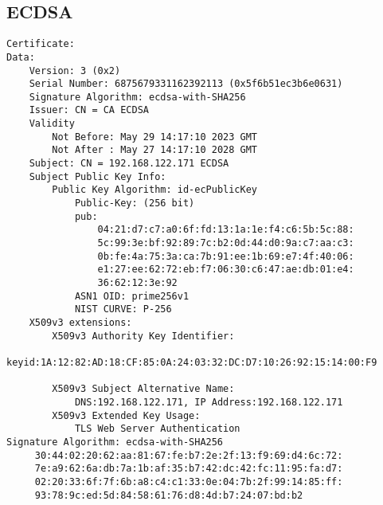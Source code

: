 \documentclass[
10pt, %
a4paper, %
oneside, %
headinclude,footinclude, %
BCOR5mm, %
]{scrartcl}
\begin{document}
\newpage
\subsection{ECDSA}

\begin{lstlisting}
Certificate:
Data:
    Version: 3 (0x2)
    Serial Number: 6875679331162392113 (0x5f6b51ec3b6e0631)
    Signature Algorithm: ecdsa-with-SHA256
    Issuer: CN = CA ECDSA
    Validity
        Not Before: May 29 14:17:10 2023 GMT
        Not After : May 27 14:17:10 2028 GMT
    Subject: CN = 192.168.122.171 ECDSA
    Subject Public Key Info:
        Public Key Algorithm: id-ecPublicKey
            Public-Key: (256 bit)
            pub:
                04:21:d7:c7:a0:6f:fd:13:1a:1e:f4:c6:5b:5c:88:
                5c:99:3e:bf:92:89:7c:b2:0d:44:d0:9a:c7:aa:c3:
                0b:fe:4a:75:3a:ca:7b:91:ee:1b:69:e7:4f:40:06:
                e1:27:ee:62:72:eb:f7:06:30:c6:47:ae:db:01:e4:
                36:62:12:3e:92
            ASN1 OID: prime256v1
            NIST CURVE: P-256
    X509v3 extensions:
        X509v3 Authority Key Identifier: 
            keyid:1A:12:82:AD:18:CF:85:0A:24:03:32:DC:D7:10:26:92:15:14:00:F9

        X509v3 Subject Alternative Name: 
            DNS:192.168.122.171, IP Address:192.168.122.171
        X509v3 Extended Key Usage: 
            TLS Web Server Authentication
Signature Algorithm: ecdsa-with-SHA256
     30:44:02:20:62:aa:81:67:fe:b7:2e:2f:13:f9:69:d4:6c:72:
     7e:a9:62:6a:db:7a:1b:af:35:b7:42:dc:42:fc:11:95:fa:d7:
     02:20:33:6f:7f:6b:a8:c4:c1:33:0e:04:7b:2f:99:14:85:ff:
     93:78:9c:ed:5d:84:58:61:76:d8:4d:b7:24:07:bd:b2

\end{lstlisting}





\newpage
\renewcommand{\refname}{\spacedlowsmallcaps{References}} %



\end{document}
